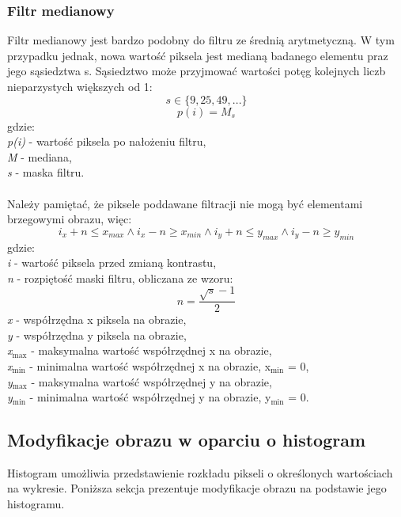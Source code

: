 \documentclass{classrep}
\begin{document}
\subsubsection{Filtr medianowy}
Filtr medianowy jest bardzo podobny do filtru ze średnią arytmetyczną. W tym przypadku jednak, nowa wartość piksela jest medianą badanego elementu praz jego sąsiedztwa s. Sąsiedztwo może przyjmować wartości potęg kolejnych liczb nieparzystych większych od 1:\\
\[ s \in \{9,25,49,...\} \]
\[ p(i) = M_{s} \]
gdzie:\\
\textit{p(i)} - wartość piksela po nałożeniu filtru,\\
\textit{M} - mediana,\\
\textit{s} - maska filtru.\\
\\
Należy pamiętać, że piksele poddawane filtracji nie mogą być elementami brzegowymi obrazu, więc:
\[ i_x + n \leq x_{max} \wedge i_x - n \geq x_{min} \wedge i_y + n \leq y_{max} \wedge i_y - n \geq y_{min} \]
gdzie:\\
\textit{i} - wartość piksela przed zmianą kontrastu,\\
\textit{n} - rozpiętość maski filtru, obliczana ze wzoru:\\
\[ n = \frac{\sqrt{s}-1}{2} \]
\textit{x} - współrzędna x piksela na obrazie,\\
\textit{y} - współrzędna y piksela na obrazie,\\
\textit{x$_{\text{max}}$} - maksymalna wartość współrzędnej x na obrazie,\\
\textit{x$_{\text{min}}$} - minimalna wartość współrzędnej x na obrazie, x$_{\text{min}}$ = 0,\\
\textit{y$_{\text{max}}$} - maksymalna wartość współrzędnej y na obrazie,\\
\textit{y$_{\text{min}}$} - minimalna wartość współrzędnej y na obrazie, y$_{\text{min}}$ = 0.\\

\subsection{Modyfikacje obrazu w oparciu o histogram}
Histogram umożliwia przedstawienie rozkładu pikseli o określonych wartościach na wykresie. Poniższa sekcja prezentuje modyfikacje obrazu na podstawie jego histogramu.
\end{document}
